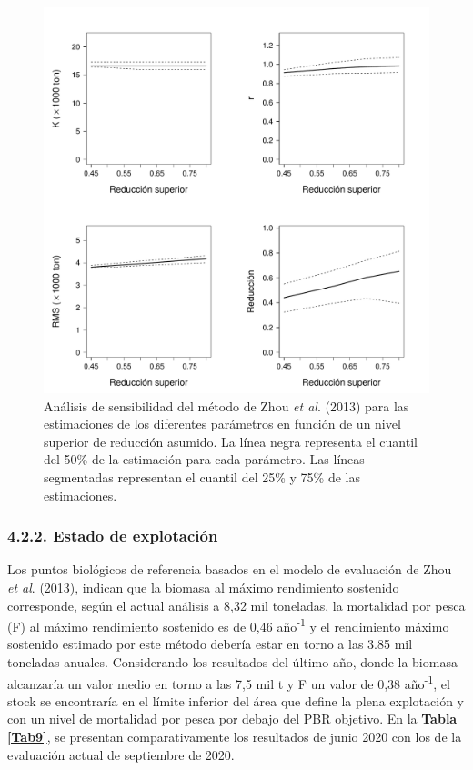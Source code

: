 \documentclass[
  spanish,
]{article}
\begin{document}
\begin{figure}[h!]
\centering
\includegraphics[width=1\textwidth]{Figuras/Fig3_Zhou2013_sensitivity-1.pdf}
\caption{Análisis de sensibilidad del método de Zhou \textit{et al}. (2013) para las estimaciones de los diferentes parámetros en función de un nivel superior de reducción asumido. La línea negra representa el cuantil del 50\% de la estimación para cada parámetro. Las líneas segmentadas representan el cuantil del 25\% y 75\% de las estimaciones.}
\label{Fig13}
\end{figure}

\pagebreak

\hypertarget{estado-de-explotaciuxf3n}{%
\subsubsection{4.2.2. Estado de
explotación}\label{estado-de-explotaciuxf3n}}

\quad

Los puntos biológicos de referencia basados en el modelo de evaluación
de Zhou \emph{et al}. (2013), indican que la biomasa al máximo
rendimiento sostenido corresponde, según el actual análisis a 8,32 mil
toneladas, la mortalidad por pesca (F) al máximo rendimiento sostenido
es de 0,46 año\textsuperscript{-1} y el rendimiento máximo sostenido
estimado por este método debería estar en torno a las 3.85 mil toneladas
anuales. Considerando los resultados del último año, donde la biomasa
alcanzaría un valor medio en torno a las 7,5 mil t y F un valor de 0,38
año\textsuperscript{-1}, el stock se encontraría en el límite inferior
del área que define la plena explotación y con un nivel de mortalidad
por pesca por debajo del PBR objetivo. En la \textbf{Tabla \ref{Tab9}},
se presentan comparativamente los resultados de junio 2020 con los de la
evaluación actual de septiembre de 2020.
\end{document}
